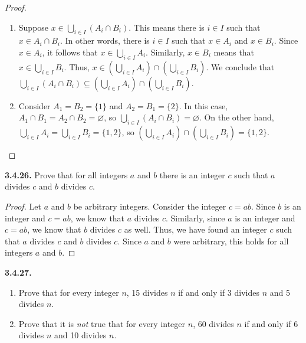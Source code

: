 \documentclass[12pt]{amsart}
\newenvironment{statement}[1]{\smallskip\noindent\color[rgb]{.6627, .3529, .6314} {\bf #1.}}{}
\theoremstyle{definition}
\theoremstyle{remark}
\begin{document}
\begin{proof}
\hfill
\begin{enumerate}
	\item Suppose $x \in \bigcup_{i \in I} (A_i \cap B_i)$.
	This means there is $i \in I$ such that $x \in A_i \cap B_i$.
	In other words, there is $i \in I$ such that $x \in A_i$ and $x \in B_i$.
	Since $x \in A_i$, it follows that $x \in \bigcup_{i \in I} A_i$.
	Similarly, $x \in B_i$ means that $x \in \bigcup_{i \in I} B_i$.
	Thus, $x \in \left( \bigcup_{i \in I} A_i \right) \cap \left( \bigcup_{i \in I} B_i \right)$.
	We conclude that $\bigcup_{i \in I} (A_i \cap B_i) \subseteq
	\left( \bigcup_{i \in I} A_i \right) \cap \left( \bigcup_{i \in I} B_i \right)$.
	
	\item Consider $A_1 = B_2 = \{ 1 \}$ and $A_2 = B_1 = \{ 2 \}$.
	In this case, $A_1 \cap B_1 = A_2 \cap B_2 = \varnothing$,
	so $\bigcup_{i \in I} (A_i \cap B_i) = \varnothing$.
	On the other hand, $\bigcup_{i \in I} A_i = \bigcup_{i \in I} B_i = \{ 1, 2 \}$, so
	$\left( \bigcup_{i \in I} A_i \right) \cap \left( \bigcup_{i \in I} B_i \right) = \{ 1, 2 \}$.
\end{enumerate}
\end{proof}


\begin{statement}{3.4.26}
Prove that for all integers $a$ and $b$ there is an integer $c$ such that $a$ divides $c$ and $b$ divides $c$.
\end{statement}

\begin{proof}
Let $a$ and $b$ be arbitrary integers.
Consider the integer $c = ab$.
Since $b$ is an integer and $c = ab$, we know that $a$ divides $c$.
Similarly, since $a$ is an integer and $c = ab$, we know that $b$ divides $c$ as well. 
Thus, we have found an integer $c$ such that $a$ divides $c$ and $b$ divides $c$.
Since $a$ and $b$ were arbitrary, this holds for all integers $a$ and $b$.
\end{proof}


\begin{statement}{3.4.27}
\begin{enumerate}
	\item Prove that for every integer $n$, 15 divides $n$ if and only if
	3 divides $n$ and 5 divides $n$.
	
	\item Prove that it is \emph{not} true that for every integer $n$,
	60 divides $n$ if and only if 6 divides $n$ and 10 divides $n$.
\end{enumerate}
\end{statement}
\end{document}
